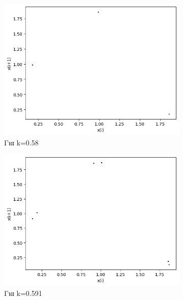 \begin{figure}[h!]
\begin{subfigure}[b]{0.25\textwidth}
		\includegraphics[width=\textwidth]{LateX images/graphs q05/g9}
		\caption{Για k=0.58}
		\label{f:k33}
	\end{subfigure}
	\hfill
	\begin{subfigure}[b]{0.25\textwidth}
		\centering
		\includegraphics[width=\textwidth]{LateX images/graphs q05/g10}
		\caption{Για k=0.591}
		\label{f:k35}
	\end{subfigure}
	\hfill
	\begin{subfigure}[b]{0.25\textwidth}
		\centering

\end{subfigure}
\end{figure}
